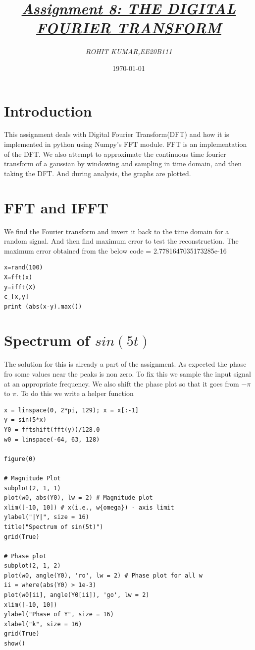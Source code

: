 \documentclass{article}
\title{\underline{\textit{\Large{Assignment 8: THE DIGITAL FOURIER TRANSFORM}}}}
\author{\textit{ROHIT KUMAR,EE20B111}}
\date{\today}
\begin{document}
\maketitle

\section{Introduction}
This assignment deals with Digital Fourier Transform(DFT) and how it is implemented in python using Numpy's FFT module. FFT is an implementation of the DFT.  We also attempt to approximate the continuous time fourier transform of a gaussian by windowing and sampling in time domain, and then taking the DFT. And during analysis, the graphs are plotted.

\section {FFT and IFFT}
We find the Fourier transform and invert it back to the time domain for a random signal. And then find maximum error to test the reconstruction.
\newline\newline
The maximum error obtained from the below code = 2.7781647035173285e-16\newline\newline

\lstset{language=Python}
\lstset{frame=lines}
\lstset{basicstyle=\footnotesize}
\newline
\newline
\begin{lstlisting}
x=rand(100)
X=fft(x)
y=ifft(X)
c_[x,y]
print (abs(x-y).max())
\end{lstlisting}

\section{Spectrum of $sin(5t)$}
The solution for this is already a part of the assignment. As expected the phase fro some values near the peaks is non zero. To fix this we sample the input signal at an appropriate frequency. We also shift the phase plot so that it goes from $-\pi$ to $\pi$. To do this we write a helper function

\begin{lstlisting}
x = linspace(0, 2*pi, 129); x = x[:-1]
y = sin(5*x)
Y0 = fftshift(fft(y))/128.0
w0 = linspace(-64, 63, 128)

figure(0)

# Magnitude Plot
subplot(2, 1, 1)  
plot(w0, abs(Y0), lw = 2) # Magnitude plot
xlim([-10, 10]) # x(i.e., w{omega}) - axis limit 
ylabel("|Y|", size = 16)
title("Spectrum of sin(5t)")
grid(True)

# Phase plot
subplot(2, 1, 2)
plot(w0, angle(Y0), 'ro', lw = 2) # Phase plot for all w 
ii = where(abs(Y0) > 1e-3)
plot(w0[ii], angle(Y0[ii]), 'go', lw = 2) 
xlim([-10, 10])
ylabel("Phase of Y", size = 16)
xlabel("k", size = 16)
grid(True)
show()
\end{lstlisting}
\end{document}
